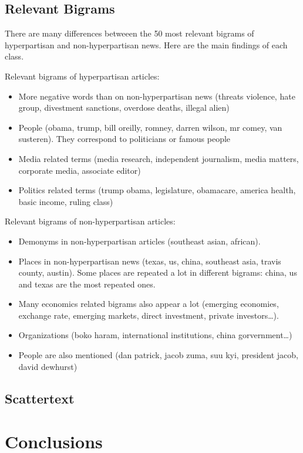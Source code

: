 \documentclass[11pt,a4paper]{article}
\begin{document}
\subsection{Relevant Bigrams}

There are many differences betweeen the 50 most relevant bigrams of
hyperpartisan and non-hyperpartisan news. Here are the main findings of
each class.

Relevant bigrams of hyperpartisan articles:

\begin{itemize}
\item
  More negative words than on non-hyperpartisan news (threats violence,
  hate group, divestment sanctions, overdose deaths, illegal alien)
\item
  People (obama, trump, bill oreilly, romney, darren wilson, mr comey,
  van susteren). They correspond to politicians or famous people
\item
  Media related terms (media research, independent journalism, media
  matters, corporate media, associate editor)
\item
  Politics related terms (trump obama, legislature, obamacare, america
  health, basic income, ruling class)
\end{itemize}

Relevant bigrams of non-hyperpartisan articles:

\begin{itemize}
\item
  Demonyms in non-hyperpartisan articles (southeast asian, african).
\item
  Places in non-hyperpartisan news (texas, us, china, southeast asia,
  travis county, austin). Some places are repeated a lot in different
  bigrams: china, us and texas are the most repeated ones.
\item
  Many economics related bigrams also appear a lot (emerging economies,
  exchange rate, emerging markets, direct investment, private
  investors\ldots).
\item
  Organizations (boko haram, international institutions, china
  gorvernment\ldots)
\item
  People are also mentioned (dan patrick, jacob zuma, suu kyi, president
  jacob, david dewhurst)
\end{itemize}

\subsection{Scattertext}

\section{Conclusions}



\end{document}

